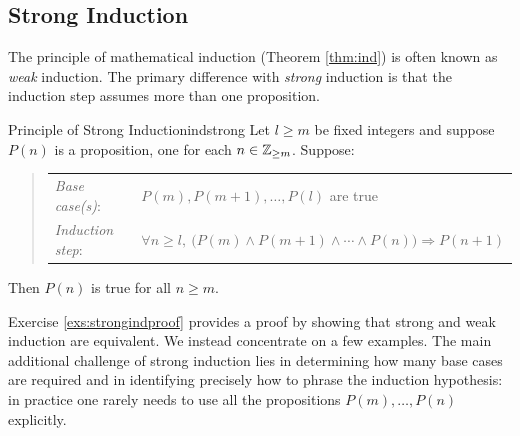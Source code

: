 % 
% 
% 
% 


\clearpage



\subsection{Strong Induction}\label{sec:strongind}

The principle of mathematical induction (Theorem \ref{thm:ind}) is often known as \emph{weak} induction. The primary difference with \emph{strong} induction is that the induction step assumes more than one proposition.

\begin{thm}{Principle of Strong Induction}{indstrong}
	Let $l\ge m$ be fixed integers and suppose $P(n)$ is a proposition, one for each $n\in\mathbb{Z}_{\ge m}$. Suppose:
	\begin{quote}
		\begin{tabular}{@{}ll}
			\emph{Base case(s)}: &$P(m),P(m+1),\ldots,P(l)$ are true\\[5pt]
			\emph{Induction step}: &$\forall n\ge l,\ \bigl(P(m)\wedge P(m+1)\wedge\cdots\wedge P(n)\bigr)\Longrightarrow P(n+1)$
		\end{tabular}
	\end{quote}
	Then $P(n)$ is true for all $n\ge m$.
\end{thm}

Exercise \ref{exs:strongindproof} provides a proof by showing that strong and weak induction are equivalent. We instead concentrate on a few examples. The main additional challenge of strong induction lies in determining how many base cases are required and in identifying precisely how to phrase the induction hypothesis: in practice one rarely needs to use all the propositions $P(m),\ldots,P(n)$ explicitly.


